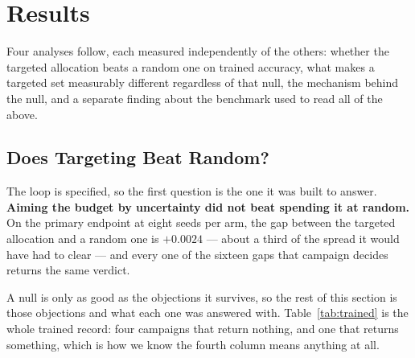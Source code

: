 \documentclass{article} %
\begin{document}
\section{Results}
\label{sec:results}
Four analyses follow, each measured independently of the others: whether the targeted allocation
beats a random one on trained accuracy, what makes a targeted set measurably different regardless of
that null, the mechanism behind the null, and a separate finding about the benchmark used to read all
of the above.

\subsection{Does Targeting Beat Random?}
\label{sec:null}
The loop is specified, so the first question is the one it was built to answer. \textbf{Aiming the
budget by uncertainty did not beat spending it at random.} On the primary endpoint at eight seeds
per arm, the gap between the targeted allocation and a random one is $+0.0024$ --- about a third of
the spread it would have had to clear --- and every one of the sixteen gaps that campaign decides
returns the same verdict.

A null is only as good as the objections it survives, so the rest of this section is those
objections and what each one was answered with. Table~\ref{tab:trained} is the whole trained record:
four campaigns that return nothing, and one that returns something, which is how we know the fourth
column means anything at all.
\end{document}
